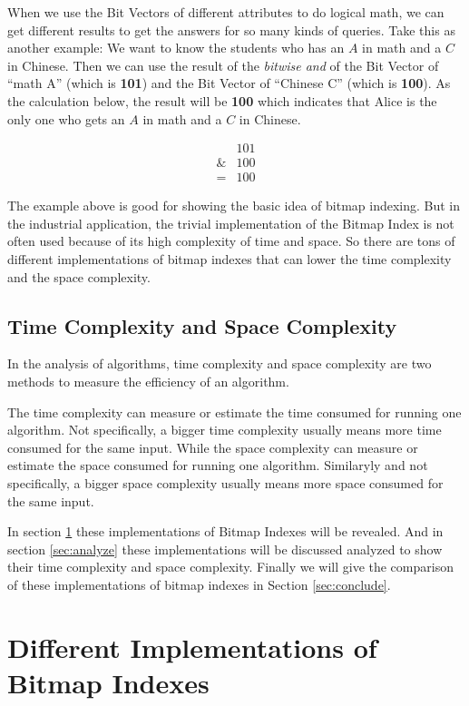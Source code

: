 \documentclass[12pt, a4paper]{article}
\begin{document}
When we use the Bit Vectors of different attributes to do logical math, we can get different results to get the answers for so many kinds of queries. Take this as another example: We want to know the students who has an $A$ in math and a $C$ in Chinese. Then we can use the result of the \emph{bitwise and} of the Bit Vector of ``math A'' (which is \textbf{101}) and the Bit Vector of ``Chinese C'' (which is \textbf{100}). As the calculation below, the result will be \textbf{100} which indicates that Alice is the only one who gets an $A$ in math and a $C$ in Chinese.

\begin{align}
  &101\\
  \& &100\\
  = &100
\end{align}

The example above is good for showing the basic idea of bitmap indexing. But in the industrial application, the trivial implementation of the Bitmap Index is not often used because of its high complexity of time and space. So there are tons of different implementations of bitmap indexes that can lower the time complexity and the space complexity.

\subsection{Time Complexity and Space Complexity}

In the analysis of algorithms, time complexity and space complexity are two methods to measure the efficiency of an algorithm.

The time complexity can measure or estimate the time consumed for running one algorithm. Not specifically, a bigger time complexity usually means more time consumed for the same input. While the space complexity can measure or estimate the space consumed for running one algorithm. Similaryly and not specifically, a bigger space complexity usually means more space consumed for the same input.

In section \ref{sec:implement} these implementations of Bitmap Indexes will be revealed. And in section \ref{sec:analyze} these implementations will be discussed analyzed to show their time complexity and space complexity. Finally we will give the comparison of these implementations of bitmap indexes in Section \ref{sec:conclude}.

\section{Different Implementations of Bitmap Indexes}\label{sec:implement}
\end{document}
